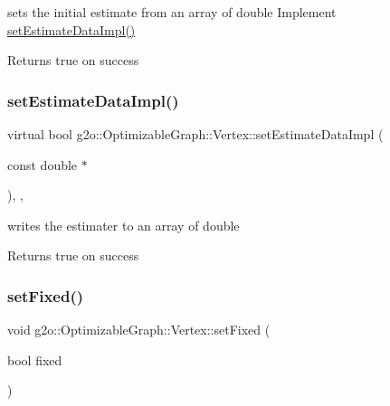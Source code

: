 sets the initial estimate from an array of double Implement \mbox{\hyperlink{classg2o_1_1_optimizable_graph_1_1_vertex_a35ab439967fd3a3d3e5608e3883d8487}{set\+Estimate\+Data\+Impl()}} \begin{DoxyReturn}{Returns}
true on success 
\end{DoxyReturn}
\mbox{\label{classg2o_1_1_optimizable_graph_1_1_vertex_a35ab439967fd3a3d3e5608e3883d8487}} 
\subsubsection{\texorpdfstring{set\+Estimate\+Data\+Impl()}{setEstimateDataImpl()}}
{\footnotesize\ttfamily virtual bool g2o\+::\+Optimizable\+Graph\+::\+Vertex\+::set\+Estimate\+Data\+Impl (\begin{DoxyParamCaption}\item[{const double $\ast$}]{ }\end{DoxyParamCaption})\hspace{0.3cm}{\ttfamily [inline]}, {\ttfamily [protected]}, {\ttfamily [virtual]}}

writes the estimater to an array of double \begin{DoxyReturn}{Returns}
true on success 
\end{DoxyReturn}
\mbox{\label{classg2o_1_1_optimizable_graph_1_1_vertex_af92ef49e1bcd6a8166afa151d367b905}} 
\subsubsection{\texorpdfstring{set\+Fixed()}{setFixed()}}
{\footnotesize\ttfamily void g2o\+::\+Optimizable\+Graph\+::\+Vertex\+::set\+Fixed (\begin{DoxyParamCaption}\item[{bool}]{fixed }\end{DoxyParamCaption})\hspace{0.3cm}{\ttfamily [inline]}}



